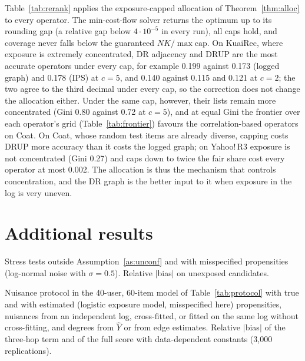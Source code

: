 \documentclass[preprint,review,12pt,authoryear]{elsarticle}
\theoremstyle{definition}
\begin{document}
Table~\ref{tab:rerank} applies the exposure-capped allocation of
Theorem~\ref{thm:alloc} to every operator. The min-cost-flow solver returns the
optimum up to its rounding gap (a relative gap below $4\cdot10^{-5}$ in every run), all
caps hold, and coverage never falls below the guaranteed $NK/\max\mathrm{cap}$. On KuaiRec, where exposure is extremely concentrated,
DR adjacency and DRUP are the most accurate operators under every cap, for
example 0.199 against 0.173 (logged graph) and 0.178 (IPS) at $c=5$, and 0.140
against 0.115 and 0.121 at $c=2$; the two agree to the third decimal under
every cap, so the correction does not change the allocation either. Under the same cap, however, their lists
remain more concentrated (Gini 0.80 against 0.72 at $c=5$), and at equal Gini
the frontier over each operator's grid (Table~\ref{tab:frontier}) favours the
correlation-based operators on Coat. On Coat, whose random test items are already
diverse, capping costs DRUP more accuracy than it costs the logged graph; on
Yahoo!\,R3 exposure is not concentrated (Gini 0.27) and caps down to twice the
fair share cost every operator at most 0.002. The allocation is thus the
mechanism that controls concentration, and the DR graph is the better input to
it when exposure in the log is very uneven.



\section{Additional results}

\begin{table}[h]\centering\small
\caption{Stress tests outside Assumption~\ref{as:unconf} and with misspecified
propensities (log-normal noise with $\sigma=0.5$). Relative $|$bias$|$ on unexposed
candidates.}\label{tab:stress}
\begin{adjustbox}{max width=\textwidth}

\end{adjustbox}
\end{table}

\begin{table}[h]\centering\small
\caption{Nuisance protocol in the 40-user, 60-item model of Table~\ref{tab:protocol}
with true and with estimated (logistic exposure model, misspecified here)
propensities, nuisances from an independent log, cross-fitted, or fitted on the
same log without cross-fitting, and degrees from $\hat Y$ or from edge
estimates. Relative $|$bias$|$ of the three-hop term and of the full score with
data-dependent constants (3{,}000 replications).}\label{tab:protocolfull}
\begin{adjustbox}{max width=\textwidth}

\end{adjustbox}
\end{table}
\end{document}
